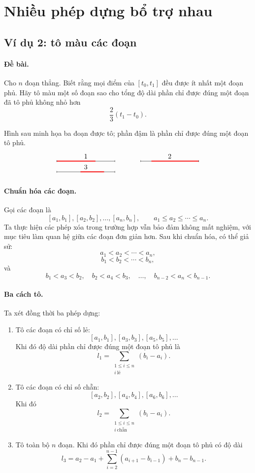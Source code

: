 \documentclass[11pt]{article}
\begin{document}
\section{Nhiều phép dựng bổ trợ nhau}

\subsection{Ví dụ 2: tô màu các đoạn}

\paragraph{Đề bài.}
Cho $n$ đoạn thẳng. Biết rằng mọi điểm của $[t_0,t_1]$ đều được ít nhất một
đoạn phủ. Hãy tô màu một số đoạn sao cho tổng độ dài phần chỉ được đúng một
đoạn đã tô phủ không nhỏ hơn
\[
  \frac{2}{3}(t_1-t_0).
\]

Hình sau minh họa ba đoạn được tô; phần đậm là phần chỉ được đúng một đoạn tô
phủ.
\[
\begin{tikzpicture}[x=1.1cm,y=0.55cm]
  \draw (0,2) -- (2.7,2);
  \draw[red,very thick] (0,2) -- (1.8,2);
  \draw (0,1) -- (2.7,1);
  \draw[red,very thick] (1.1,1) -- (2.2,1);
  \draw (3.9,2) -- (6.6,2);
  \draw[red,very thick] (4.4,2) -- (6.6,2);
  \node at (1.35,2.45) {$1$};
  \node at (5.25,2.45) {$2$};
  \node at (1.35,1.45) {$3$};
  \foreach \x/\y in {0/2,2.7/2,0/1,2.7/1,3.9/2,6.6/2}
    \draw (\x,\y-0.08) -- (\x,\y+0.08);
\end{tikzpicture}
\]

\paragraph{Chuẩn hóa các đoạn.}
Gọi các đoạn là
\[
  [a_1,b_1],[a_2,b_2],\ldots,[a_n,b_n],
  \qquad a_1\le a_2\le\cdots\le a_n.
\]
Ta thực hiện các phép xóa trong trường hợp vẫn bảo đảm không mất nghiệm, với
mục tiêu làm quan hệ giữa các đoạn đơn giản hơn. Sau khi chuẩn hóa, có thể giả
sử:
\[
  a_1<a_2<\cdots<a_n,
\]
\[
  b_1<b_2<\cdots<b_n,
\]
và
\[
  b_1<a_3<b_2,\quad b_2<a_4<b_3,\quad \ldots,\quad
  b_{n-2}<a_n<b_{n-1}.
\]

\paragraph{Ba cách tô.}
Ta xét đồng thời ba phép dựng:
\begin{enumerate}
  \item Tô các đoạn có chỉ số lẻ:
  \[
    [a_1,b_1],[a_3,b_3],[a_5,b_5],\ldots
  \]
  Khi đó độ dài phần chỉ được đúng một đoạn tô phủ là
  \[
    l_1=\sum_{\substack{1\le i\le n\\ i\ \text{lẻ}}}(b_i-a_i).
  \]
  \item Tô các đoạn có chỉ số chẵn:
  \[
    [a_2,b_2],[a_4,b_4],[a_6,b_6],\ldots
  \]
  Khi đó
  \[
    l_2=\sum_{\substack{1\le i\le n\\ i\ \text{chẵn}}}(b_i-a_i).
  \]
  \item Tô toàn bộ $n$ đoạn. Khi đó phần chỉ được đúng một đoạn tô phủ có độ
  dài
  \[
    l_3=a_2-a_1+\sum_{i=2}^{n-1}(a_{i+1}-b_{i-1})+b_n-b_{n-1}.
  \]
\end{enumerate}
\end{document}
